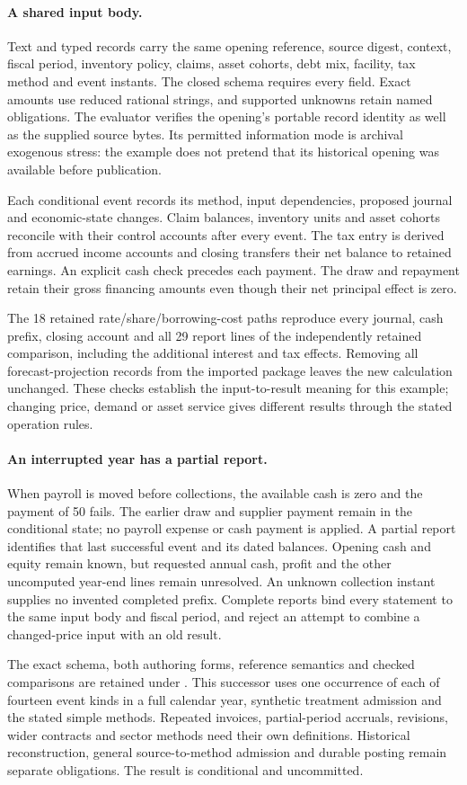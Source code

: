 \paragraph{A shared input body.}
Text and typed records carry the same opening reference, source digest,
context, fiscal period, inventory policy, claims, asset cohorts, debt mix,
facility, tax method and event instants. The closed schema requires every
field. Exact amounts use reduced rational strings, and supported unknowns
retain named obligations. The evaluator verifies the opening's portable
record identity as well as the supplied source bytes. Its permitted
information mode is archival exogenous stress: the example does not pretend
that its historical opening was available before publication.

Each conditional event records its method, input dependencies, proposed
journal and economic-state changes. Claim balances, inventory units and
asset cohorts reconcile with their control accounts after every event. The
tax entry is derived from accrued income accounts and closing transfers
their net balance to retained earnings. An explicit cash check precedes
each payment. The draw and repayment retain their gross financing amounts
even though their net principal effect is zero.

The 18 retained rate/share/borrowing-cost paths reproduce every journal,
cash prefix, closing account and all 29 report lines of the independently
retained comparison, including the additional interest and tax effects.
Removing all forecast-projection records from the imported package leaves
the new calculation unchanged. These checks establish the input-to-result
meaning for this example; changing price, demand or asset service gives
different results through the stated operation rules.

\paragraph{An interrupted year has a partial report.}
When payroll is moved before collections, the available cash is zero and
the payment of 50 fails. The earlier draw and supplier payment remain in
the conditional state; no payroll expense or cash payment is applied. A
partial report identifies that last successful event and its dated balances.
Opening cash and equity remain known, but requested annual cash, profit
and the other uncomputed year-end lines remain unresolved. An unknown
collection instant supplies no invented completed prefix. Complete reports
bind every statement to the same input body and fiscal period, and reject
an attempt to combine a changed-price input with an old result.

The exact schema, both authoring forms, reference semantics and checked
comparisons are retained under
. This successor
uses one occurrence of each of fourteen event kinds in a full calendar
year, synthetic treatment admission and the stated simple methods. Repeated
invoices, partial-period accruals, revisions, wider contracts and sector
methods need their own definitions. Historical reconstruction, general
source-to-method admission and durable posting remain separate obligations.
The result is conditional and uncommitted.
